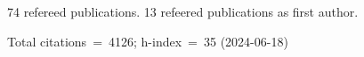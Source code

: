 74 refereed publications. 13 refeered publications as first author.

Total citations~=~4126; h-index~=~35 (2024-06-18)
